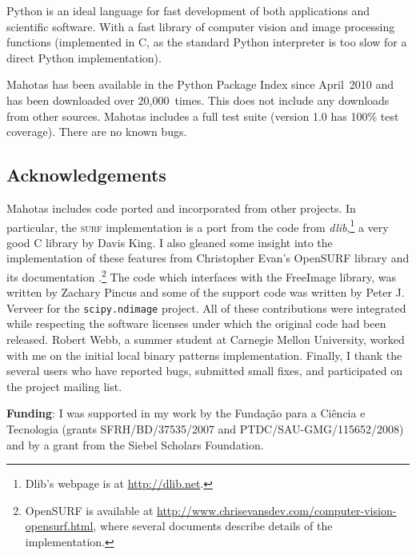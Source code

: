 \documentclass{article}
\newcommand*{\cpp}{{C\nolinebreak[4]\hspace{-.05em}\raisebox{.4ex}{\tiny\textbf{++}}}}
\let\code\texttt
\begin{document}
Python is an ideal language for fast development of both applications and
scientific software. With a fast library of computer vision and image
processing functions (implemented in \cpp{}, as the standard Python interpreter
is too slow for a direct Python implementation).

Mahotas has been available in the Python Package Index since April~2010 and has
been downloaded over 20,000~times. This does not include any downloads from
other sources. Mahotas includes a full test suite (version 1.0 has 100\% test
coverage). There are no known bugs.

\subsection*{Acknowledgements}

Mahotas includes code ported and incorporated from other projects. In
particular, the \textsc{surf} implementation is a port from the code from
\textit{dlib},\footnote{Dlib's webpage is at \url{http://dlib.net}.} a very
good \cpp{} library by Davis King. I also gleaned some insight into the
implementation of these features from Christopher Evan's OpenSURF library and
its documentation \citep{evans2009}.\footnote{OpenSURF is available at
\url{http://www.chrisevansdev.com/computer-vision-opensurf.html}, where several
documents describe details of the implementation.} The code which interfaces
with the FreeImage library, was written by Zachary Pincus and some of the
support code was written by Peter J. Verveer for the \code{scipy.ndimage}
project. All of these contributions were integrated while respecting the
software licenses under which the original code had been released. Robert Webb,
a summer student at Carnegie Mellon University, worked with me on the initial
local binary patterns implementation. Finally, I thank the several users who
have reported bugs, submitted small fixes, and participated on the project
mailing list.

\textbf{Funding}: I was supported in my work by the Funda\c c\~{a}o para a
Ci\^encia e Tecnologia (grants SFRH/BD/37535/2007 and PTDC/SAU-GMG/115652/2008)
and by a grant from the Siebel Scholars Foundation.

\printbibliography
\end{document}
